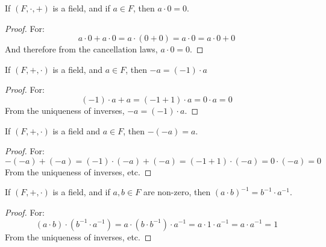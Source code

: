             \begin{theorem}
                If $(F,\cdot,+)$ is a field, and if $a\in{F}$, then
                $a\cdot{0}=0$.
            \end{theorem}
            \begin{proof}
                For:
                \begin{equation}
                    a\cdot{0}+a\cdot{0}=a\cdot(0+0)=
                    a\cdot{0}=a\cdot{0}+0
                \end{equation}
                And therefore from the cancellation laws,
                $a\cdot{0}=0$.
            \end{proof}
            \begin{theorem}
                If $(F,+,\cdot)$ is a field, and $a\in{F}$, then
                $\minus{a}=(\minus{1})\cdot{a}$
            \end{theorem}
            \begin{proof}
                For:
                \begin{equation}
                    (\minus{1})\cdot{a}+a=
                    (\minus{1}+1)\cdot{a}=
                    0\cdot{a}=0
                \end{equation}
                From the uniqueness of inverses,
                $\minus{a}=(\minus{1})\cdot{a}$.
            \end{proof}
            \begin{theorem}
                If $(F,+,\cdot)$ is a field and $a\in{F}$, then
                $\minus(\minus{a})=a$.
            \end{theorem}
            \begin{proof}
                For:
                \begin{equation}
                    \minus(\minus{a})+(\minus{a})=
                    (\minus{1})\cdot(\minus{a})+(\minus{a})
                    =(\minus{1}+1)\cdot(\minus{a})
                    =0\cdot(\minus{a})=0
                \end{equation}
                From the uniqueness of inverses, etc.
            \end{proof}
            \begin{theorem}
                If $(F,+,\cdot)$ is a field, and if $a,b\in{F}$ are
                non-zero, then $(a\cdot{b})^{\minus{1}}=%
                                b^{\minus{1}}\cdot{a}^{\minus{1}}$.
            \end{theorem}
            \begin{proof}
                For:
                \begin{equation}
                    (a\cdot{b})
                    \cdot(b^{\minus{1}}\cdot{a}^{\minus{1}})
                    =a\cdot
                    (b\cdot{b}^{\minus{1}})\cdot{a}^{\minus{1}}
                    =a\cdot{1}\cdot{a}^{\minus{1}}=
                    a\cdot{a}^{\minus{1}}=1
                \end{equation}
                From the uniqueness of inverses, etc.
            \end{proof}
